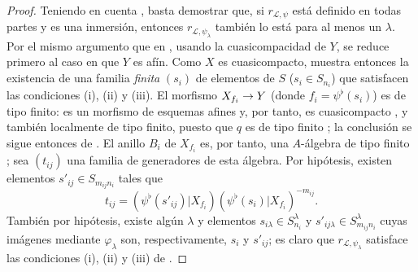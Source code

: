 \documentclass[oneside,10pt]{amsart}
\makeatletter
\newcommand{\ega@arrow}[2]{\mathchoice{#1}{#2}{#2}{#2}}
\renewcommand{\to}{\ega@arrow{\longrightarrow}{\rightarrow}}
\newcommand{\oldpage}[2][]{\marginnote{\normalfont\footnotesize\textbf{#1}~|~#2}\ignorespaces}
\makeatother
\begin{document}
\oldpage[II]{70}
\begin{proof}
Teniendo en cuenta , basta demostrar que, si $r_{\mathcal{L},\psi}$ está definido en todas partes y es una inmersión, entonces $r_{\mathcal{L},\psi_\lambda}$ también lo está para al menos un $\lambda$.
Por el mismo argumento que en , usando la cuasicompacidad de $Y$, se reduce primero al caso en que $Y$ es afín.
Como $X$ es cuasicompacto,  muestra entonces la existencia de una familia \emph{finita} $(s_i)$ de elementos de $S$ ($s_i\in S_{n_i}$) que satisfacen las condiciones (i), (ii) y (iii).
El morfismo $X_{f_i}\to Y$ (donde $f_i=\psi^\flat(s_i)$) es de tipo finito: es un morfismo de esquemas afines y, por tanto, es cuasicompacto , y también localmente de tipo finito, puesto que $q$ es de tipo finito ; la conclusión se sigue entonces de .
El anillo $B_i$ de $X_{f_i}$ es, por tanto, una $A$-álgebra de tipo finito ;
sea $(t_{ij})$ una familia de generadores de esta álgebra.
Por hipótesis, existen elementos $s'_{ij}\in S_{m_{ij}n_i}$ tales que
\[
  t_{ij}=(\psi^\flat(s'_{ij})|X_{f_i})
  (\psi^\flat(s_i)|X_{f_i})^{-m_{ij}}.
\]
También por hipótesis, existe algún $\lambda$ y elementos $s_{i\lambda}\in S_{n_i}^\lambda$ y $s'_{ij\lambda}\in S_{m_{ij}n_i}^\lambda$ cuyas imágenes mediante $\varphi_\lambda$ son, respectivamente, $s_i$ y $s'_{ij}$;
es claro que $r_{\mathcal{L},\psi_\lambda}$ satisface las condiciones (i), (ii) y (iii) de .
\end{proof}
\end{document}

